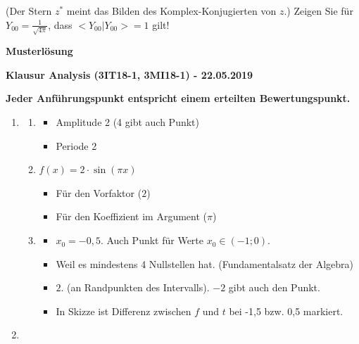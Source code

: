 \documentclass[12pt]{article}
\begin{document}
(Der Stern $z^{*}$ meint das Bilden des Komplex-Konjugierten von $z$.) Zeigen Sie für $Y_{00} = \frac{1}{\sqrt{4\pi}}$, dass $<Y_{00}|Y_{00}> = 1$ gilt!

\newpage

\begin{center}
{\bf {\large Musterlösung}}
\end{center}

\begin{center}
{\bf {\large Klausur Analysis (3IT18-1, 3MI18-1) - 22.05.2019}}
\end{center}

\begin{center}
\textbf{Jeder Anführungspunkt entspricht einem erteilten Bewertungspunkt.}
\end{center}

\begin{enumerate}

\item
\begin{enumerate}

\item
\begin{itemize}
\item Amplitude 2 (4 gibt auch Punkt)
\item Periode 2
\end{itemize}

\item $f(x) = 2\cdot\sin(\pi x)$
\begin{itemize}
\item Für den Vorfaktor ($2$)
\item Für den Koeffizient im Argument ($\pi$)
\end{itemize}

\item 
\begin{itemize}
\item $x_0=-0{,}5$. Auch Punkt für Werte $x_0\in (-1;0)$.
\item Weil es mindestens 4 Nullstellen hat. (Fundamentalsatz der Algebra)
\item $2$. (an Randpunkten des Intervalls). $-2$ gibt auch den Punkt.
\item In Skizze ist Differenz zwischen $f$ und $t$ bei -1,5 bzw. 0,5 markiert. 
\end{itemize}

\end{enumerate}

\item
\begin{enumerate}


\end{enumerate}
\end{enumerate}
\end{document}
